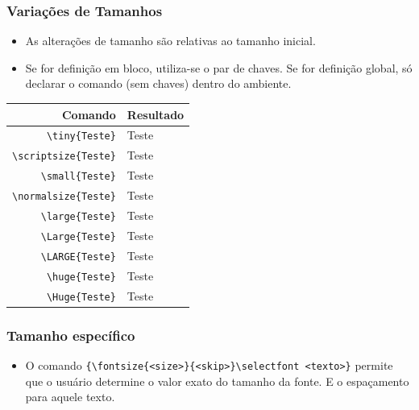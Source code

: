 \documentclass{beamer}
\begin{document}
\begin{frame}[fragile]
    \frametitle{Variações de Tamanhos}

    \begin{itemize}
        \item As alterações de tamanho são relativas ao tamanho inicial. 
        \item Se for definição em bloco, utiliza-se o par de chaves. Se for definição global, só declarar o comando (sem chaves) dentro do ambiente.
    \end{itemize}

    \begin{table}[h]
        \begin{tabular}{r|l}
            Comando & Resultado \\ \hline 
            \lstinline[style=myStyleLatex]!\tiny{Teste}! & \tiny{Teste} \\ \hline 
            \lstinline[style=myStyleLatex]!\scriptsize{Teste}! & \scriptsize{Teste} \\ \hline 
            \lstinline[style=myStyleLatex]!\small{Teste}! & \small{Teste} \\ \hline 
            \lstinline[style=myStyleLatex]!\normalsize{Teste}! & \normalsize{Teste} \\ \hline 
            \lstinline[style=myStyleLatex]!\large{Teste}! & \large{Teste} \\ \hline 
            \lstinline[style=myStyleLatex]!\Large{Teste}! & \Large{Teste} \\ \hline 
            \lstinline[style=myStyleLatex]!\LARGE{Teste}! & \LARGE{Teste} \\ \hline
            \lstinline[style=myStyleLatex]!\huge{Teste}! & \huge{Teste} \\ \hline
            \lstinline[style=myStyleLatex]!\Huge{Teste}! & \Huge{Teste} \\ \hline   
        \end{tabular}
    \end{table}

\end{frame}

\begin{frame}[fragile]
    \frametitle{Tamanho específico}

    \begin{itemize}
        \item O comando \lstinline[style=myStyleLatex]!{\fontsize{<size>}{<skip>}\selectfont <texto>}! permite que o usuário determine o valor exato do tamanho da fonte. E o espaçamento para aquele texto.
    \end{itemize}

\end{frame}
\end{document}
